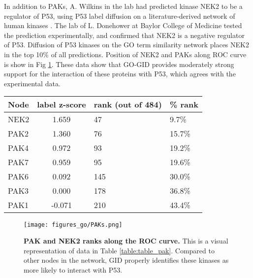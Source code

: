 \documentclass[12pt,a4paper]{report}
\begin{document}
{{In addition to PAKs, A. Wilkins in the lab had predicted kinase NEK2 to be a regulator of P53, using P53 label diffusion on a literature-derived network of human kinases \cite{NEK2}. The lab of L. Donehower at Baylor College of Medicine tested the prediction experimentally, and confirmed that NEK2 is a negative regulator of P53. Diffusion of P53 kinases on the GO term similarity network places NEK2 in the top 10\% of all predictions. Position of NEK2 and PAKs along ROC curve is show in Fig \ref{fig:go_paks}. These data show that GO-GID provides moderately strong support for the interaction of these proteins with P53, which agrees with the experimental data.

\begin{table*}
\begin{minipage}[c][\textheight]{\textwidth}
\centering
\vspace{-7in}
\setlength{\tabcolsep}{5pt} %
\renewcommand{\arraystretch}{0.5} %
\begin{tabular}{lcll}
\textbf{Node} & \textbf{label z-score} & \textbf{rank (out of 484)} & \textbf{\% rank} \\ \hline
NEK2 & 1.659       & 47   & 9.7\%   \\
PAK2 & 1.360       & 76   & 15.7\%  \\
PAK4 & 0.972       & 93   & 19.2\%  \\
PAK7 & 0.959       & 95   & 19.6\%  \\
PAK6 & 0.092       & 145  & 30.0\%  \\
PAK3 & 0.000       & 178  & 36.8\%  \\
PAK1 & -0.071      & 210  & 43.4\%\\  \hline

\end{tabular}
 \caption[GID ranks of PAKs and NEK2.]{\textbf{GID ranks of PAKs and NEK2}. GID ranks PAKs and NEK-2 in the upper half of the predictions for P53 interactions. Average percentile rank of these nodes is 25\%.}
  \label{table:table_pak}
    \end{minipage}
\end{table*}

\begin{figure}
\begin{minipage}[c][\textheight]{\textwidth}
\vspace*{-6in}
\centering
  \texttt{[image: figures\_go/PAKs.png]}
  \caption[PAK and NEK2 ranks along the ROC curve.] {\textbf{PAK and NEK2 ranks along the ROC curve.} This is a visual representation of data in Table \ref{table:table_pak}. Compared to other nodes in the network, GID properly identifies these kinases as more likely to interact with P53.}
  \label{fig:go_paks}
  \end{minipage}


\end{figure}}}
\end{document}
